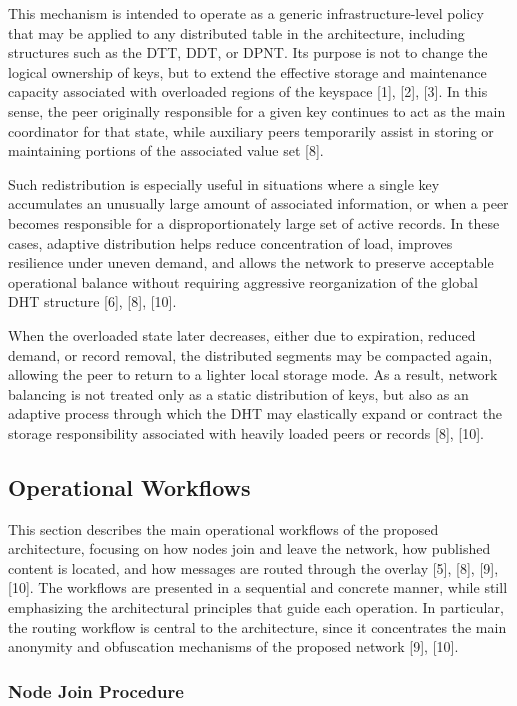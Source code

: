 \documentclass[12pt,a4paper]{article}
\begin{document}
This mechanism is intended to operate as a generic infrastructure-level policy that may be applied to any distributed table in the architecture, including structures such as the DTT, DDT, or DPNT. Its purpose is not to change the logical ownership of keys, but to extend the effective storage and maintenance capacity associated with overloaded regions of the keyspace [1], [2], [3]. In this sense, the peer originally responsible for a given key continues to act as the main coordinator for that state, while auxiliary peers temporarily assist in storing or maintaining portions of the associated value set [8].

Such redistribution is especially useful in situations where a single key accumulates an unusually large amount of associated information, or when a peer becomes responsible for a disproportionately large set of active records. In these cases, adaptive distribution helps reduce concentration of load, improves resilience under uneven demand, and allows the network to preserve acceptable operational balance without requiring aggressive reorganization of the global DHT structure [6], [8], [10].

When the overloaded state later decreases, either due to expiration, reduced demand, or record removal, the distributed segments may be compacted again, allowing the peer to return to a lighter local storage mode. As a result, network balancing is not treated only as a static distribution of keys, but also as an adaptive process through which the DHT may elastically expand or contract the storage responsibility associated with heavily loaded peers or records [8], [10].




\subsection{Operational Workflows}

This section describes the main operational workflows of the proposed architecture, focusing on how nodes join and leave the network, how published content is located, and how messages are routed through the overlay [5], [8], [9], [10]. The workflows are presented in a sequential and concrete manner, while still emphasizing the architectural principles that guide each operation. In particular, the routing workflow is central to the architecture, since it concentrates the main anonymity and obfuscation mechanisms of the proposed network [9], [10].

\subsubsection{Node Join Procedure}
\end{document}
